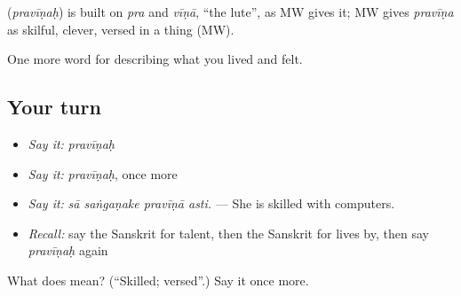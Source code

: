 \begin{cousinweb}
\textbf{} (\emph{pravīṇaḥ}) is built on \emph{pra} and \emph{vīṇā}, \textquotedblleft{}the lute\textquotedblright{}, as MW gives it; MW gives \emph{pravīṇa} as skilful, clever, versed in a thing (MW).
\end{cousinweb}

\begin{grammarlens}[title={What you've built}]
One more word for describing what you lived and felt.
\end{grammarlens}

\subsection*{Your turn}
\begin{itemize}
\raggedright
  \item \emph{Say it:} \emph{pravīṇaḥ}
  \item \emph{Say it:} \emph{pravīṇaḥ}, once more
  \item \emph{Say it:} \emph{sā saṅgaṇake pravīṇā asti.} — She is skilled with computers.
  \item \emph{Recall:} say the Sanskrit for talent, then the Sanskrit for lives by, then say \emph{pravīṇaḥ} again
\end{itemize}

\begin{tcolorbox}[breakable,colback=teal!4,colframe=teal!35!black,title={Before you move on}]
What does  mean? (\textquotedblleft{}Skilled; versed\textquotedblright{}.) Say it once more.
\end{tcolorbox}
